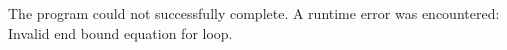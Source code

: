 The program could not successfully complete.
A runtime error was encountered:
Invalid end bound equation for loop.
